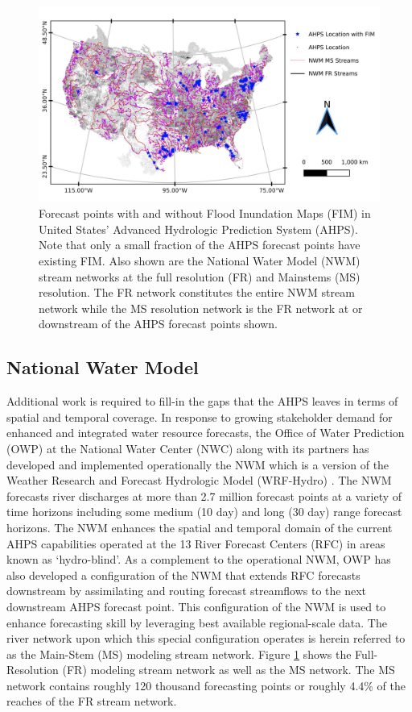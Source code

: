 \begin{figure}[h!]
\centering
\includegraphics[scale=1.0]{figures/forecast_points.jpg}
\caption{Forecast points with and without Flood Inundation Maps (FIM) in United States' Advanced Hydrologic Prediction System (AHPS).
Note that only a small fraction of the AHPS forecast points have existing FIM.
Also shown are the National Water Model (NWM) stream networks at the full resolution (FR) and Mainstems (MS) resolution.
The FR network constitutes the entire NWM stream network while the MS resolution network is the FR network at or downstream of the AHPS forecast points shown.
}
\label{fig:forecast_points}
\end{figure}
%
\subsection{National Water Model}
\label{ssec:national_water_model}
%
Additional work is required to fill-in the gaps that the AHPS leaves in terms of spatial and temporal coverage.
In response to growing stakeholder demand for enhanced and integrated water resource forecasts, the Office of Water Prediction (OWP) at the National Water Center (NWC) along with its partners has developed and implemented operationally the NWM which is a version of the Weather Research and Forecast Hydrologic Model (WRF-Hydro) \cite{gochis2018wrf,cosgrove2019evolution}. 
The NWM forecasts river discharges at more than 2.7 million forecast points at a variety of time horizons including some medium (10 day) and long (30 day) range forecast horizons.
The NWM enhances the spatial and temporal domain of the current AHPS capabilities operated at the 13 River Forecast Centers (RFC) in areas known as `hydro-blind'.
As a complement to the operational NWM, OWP has also developed a configuration of the NWM that extends RFC forecasts downstream by assimilating and routing forecast streamflows to the next downstream AHPS forecast point.
This configuration of the NWM is used to enhance forecasting skill by leveraging best available regional-scale data.
The river network upon which this special configuration operates is herein referred to as the Main-Stem (MS) modeling stream network.
Figure \ref{fig:forecast_points} shows the Full-Resolution (FR) modeling stream network as well as the MS network.
The MS network contains roughly 120 thousand forecasting points or roughly 4.4\% of the reaches of the FR stream network.

